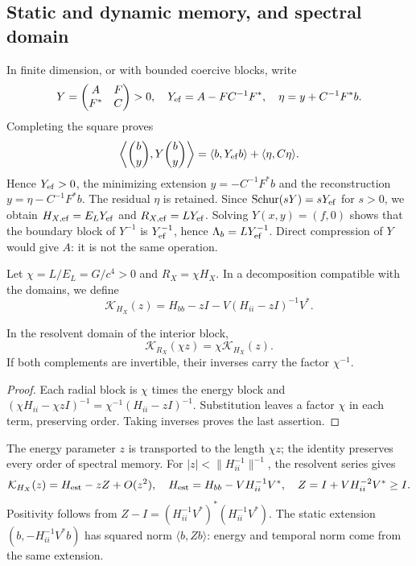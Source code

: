 \subsection{Static and dynamic memory, and spectral domain}
\label{hmtcuatro:gea:memoria}

In finite dimension, or with bounded coercive blocks, write
\[
Y=\begin{pmatrix}A&F\\F^*&C\end{pmatrix}>0,\quad
Y_{\rm ef}=A-FC^{-1}F^*,\quad \eta=y+C^{-1}F^*b.
\]
Completing the square proves
\begin{equation}
\left\langle\binom b y,Y\binom b y\right\rangle
=\langle b,Y_{\rm ef}b\rangle+\langle\eta,C\eta\rangle.
\label{hmtcuatro:gea:schur-prueba}
\end{equation}
Hence $Y_{\rm ef}>0$, the minimizing extension $y=-C^{-1}F^*b$ and the reconstruction $y=\eta-C^{-1}F^*b$. The residual $\eta$ is retained. Since $\operatorname{Schur}(sY)=sY_{\rm ef}$ for $s>0$, we obtain $H_{X,\rm ef}=E_LY_{\rm ef}$ and $R_{X,\rm ef}=LY_{\rm ef}$. Solving $Y(x,y)=(f,0)$ shows that the boundary block of $Y^{-1}$ is $Y_{\rm ef}^{-1}$, hence $\Lambda_b=LY_{\rm ef}^{-1}$. Direct compression of $Y$ would give $A$: it is not the same operation.

Let $\chi=L/E_L=G/c^4>0$ and $R_X=\chi H_X$. In a decomposition compatible with the domains, we define
\[
\mathcal K_{H_X}(z)=H_{bb}-zI-V(H_{ii}-zI)^{-1}V^*.
\]
\begin{proposition}
\label{hmtcuatro:gea:resolvente-prop} In the resolvent domain of the interior block,
\begin{equation}
\mathcal K_{R_X}(\chi z)=\chi\mathcal K_{H_X}(z).
\label{hmtcuatro:gea:resolvente}
\end{equation}
If both complements are invertible, their inverses carry the factor $\chi^{-1}$.
\end{proposition}
\begin{proof}
Each radial block is $\chi$ times the energy block and $(\chi H_{ii}-\chi zI)^{-1}=\chi^{-1}(H_{ii}-zI)^{-1}$. Substitution leaves a factor $\chi$ in each term, preserving order. Taking inverses proves the last assertion.
\end{proof}
The energy parameter $z$ is transported to the length $\chi z$; the identity preserves every order of spectral memory. For $|z|<\|H_{ii}^{-1}\|^{-1}$, the resolvent series gives
\[
\mathcal K_{H_X}(z)=H_{\rm est}-zZ+O(z^2),\quad
H_{\rm est}=H_{bb}-VH_{ii}^{-1}V^*,\quad
Z=I+VH_{ii}^{-2}V^*\geq I.
\]
Positivity follows from $Z-I=(H_{ii}^{-1}V^*)^*(H_{ii}^{-1}V^*)$. The static extension $(b,-H_{ii}^{-1}V^*b)$ has squared norm $\langle b,Zb\rangle$: energy and temporal norm come from the same extension.

